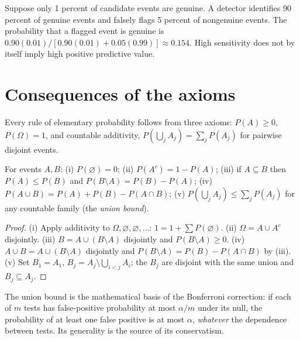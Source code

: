 \begin{workedexample}
Suppose only 1 percent of candidate events are genuine. A detector identifies 90 percent of genuine events and falsely flags 5 percent of nongenuine events. The probability that a flagged event is genuine is $0.90(0.01)/[0.90(0.01)+0.05(0.99)]\approx0.154$. High sensitivity does not by itself imply high positive predictive value.
\end{workedexample}
\section{Consequences of the axioms}
Every rule of elementary probability follows from three axioms: $P(A)\ge0$, $P(\Omega)=1$, and countable additivity, $P(\bigcup_jA_j)=\sum_jP(A_j)$ for pairwise disjoint events.

\begin{proposition}
For events $A,B$: (i) $P(\varnothing)=0$; (ii) $P(A^c)=1-P(A)$; (iii) if $A\subseteq B$ then $P(A)\le P(B)$ and $P(B\setminus A)=P(B)-P(A)$; (iv) $P(A\cup B)=P(A)+P(B)-P(A\cap B)$; (v) $P(\bigcup_jA_j)\le\sum_jP(A_j)$ for any countable family (the \emph{union bound}).
\end{proposition}
\begin{proof}
(i) Apply additivity to $\Omega,\varnothing,\varnothing,\ldots$: $1=1+\sum P(\varnothing)$. (ii) $\Omega=A\cup A^c$ disjointly. (iii) $B=A\cup(B\setminus A)$ disjointly and $P(B\setminus A)\ge0$. (iv) $A\cup B=A\cup(B\setminus A)$ disjointly and $P(B\setminus A)=P(B)-P(A\cap B)$ by (iii). (v) Set $B_1=A_1$, $B_j=A_j\setminus\bigcup_{i<j}A_i$; the $B_j$ are disjoint with the same union and $B_j\subseteq A_j$.
\end{proof}
The union bound is the mathematical basis of the Bonferroni correction: if each of $m$ tests has false-positive probability at most $\alpha/m$ under its null, the probability of at least one false positive is at most $\alpha$, \emph{whatever} the dependence between tests. Its generality is the source of its conservatism.

